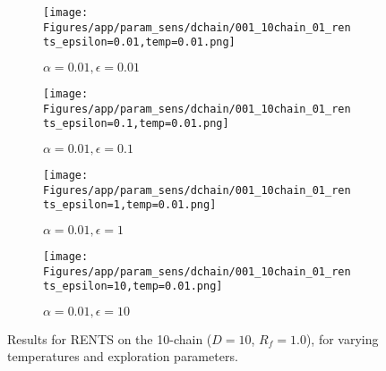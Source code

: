 \documentclass{article}
\theoremstyle{plain}
\begin{document}
\begin{appendices}
\begin{figure}
                \begin{subfigure}[b]{0.24\textwidth}
                    \centering
                    \texttt{[image: Figures/app/param\_sens/dchain/001\_10chain\_01\_rents\_epsilon=0.01,temp=0.01.png]}
                    \caption*{$\alpha=0.01,\epsilon=0.01$}
                \end{subfigure}
                \begin{subfigure}[b]{0.24\textwidth}
                    \centering
                    \texttt{[image: Figures/app/param\_sens/dchain/001\_10chain\_01\_rents\_epsilon=0.1,temp=0.01.png]}
                    \caption*{$\alpha=0.01,\epsilon=0.1$}
                \end{subfigure}
                \begin{subfigure}[b]{0.24\textwidth}
                    \centering
                    \texttt{[image: Figures/app/param\_sens/dchain/001\_10chain\_01\_rents\_epsilon=1,temp=0.01.png]}
                    \caption*{$\alpha=0.01,\epsilon=1$}
                \end{subfigure}
                \begin{subfigure}[b]{0.24\textwidth}
                    \centering
                    \texttt{[image: Figures/app/param\_sens/dchain/001\_10chain\_01\_rents\_epsilon=10,temp=0.01.png]}
                    \caption*{$\alpha=0.01,\epsilon=10$}
                \end{subfigure}
                
                \caption{Results for RENTS on the 10-chain ($D=10$, $R_f=1.0$), for varying temperatures and exploration parameters.}
                \label{fig:rents_10chain_hps}
            \end{figure}


            \begin{figure}
                \centering
                

\end{figure}
\end{appendices}
\end{document}
